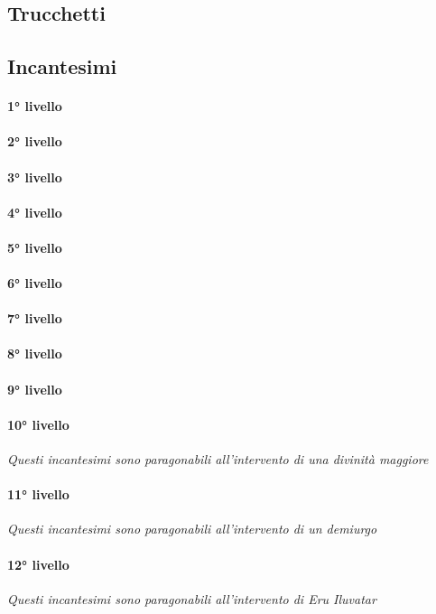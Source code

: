 \subsection{Trucchetti}

\subsection{Incantesimi}
\paragraph{1° livello}
\paragraph{2° livello}
\paragraph{3° livello}
\paragraph{4° livello}
\paragraph{5° livello}
\paragraph{6° livello}
\paragraph{7° livello}
\paragraph{8° livello}
\paragraph{9° livello}
\paragraph{10° livello} \textit{Questi incantesimi sono paragonabili all'intervento di una divinità maggiore}
\paragraph{11° livello} \textit{Questi incantesimi sono paragonabili all'intervento di un demiurgo}
\paragraph{12° livello} \textit{Questi incantesimi sono paragonabili all'intervento di Eru Iluvatar}

